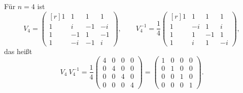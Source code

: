 \begin{example}
Für $ n = 4 $ ist
\[
    V_{4}
  = \begin{pmatrix*}[r]
      1 &  1 &  1 &  1 \\
      1 &  i & -1 & -i \\
      1 & -1 &  1 & -1 \\
      1 & -i & -1 & i
    \end{pmatrix*}, \qquad
    V_{4}^{-1}
  = \frac{1}{4} \begin{pmatrix*}[r]
      1 &  1 &  1 &  1 \\
      1 & -i &  1 &  i \\
      1 &  1 & -1 &  1 \\
      1 &  i &  1 & -i
    \end{pmatrix*},
\]
das heißt
\[
      V_{4} \ V_{4}^{-1}
    = \frac{1}{4} \begin{pmatrix}
        4 & 0 & 0 & 0 \\
        0 & 4 & 0 & 0 \\
        0 & 0 & 4 & 0 \\
        0 & 0 & 0 & 4
      \end{pmatrix}
    = \begin{pmatrix}
        1 & 0 & 0 & 0 \\
        0 & 1 & 0 & 0 \\
        0 & 0 & 1 & 0 \\
        0 & 0 & 0 & 1
      \end{pmatrix}.
\]
\end{example}